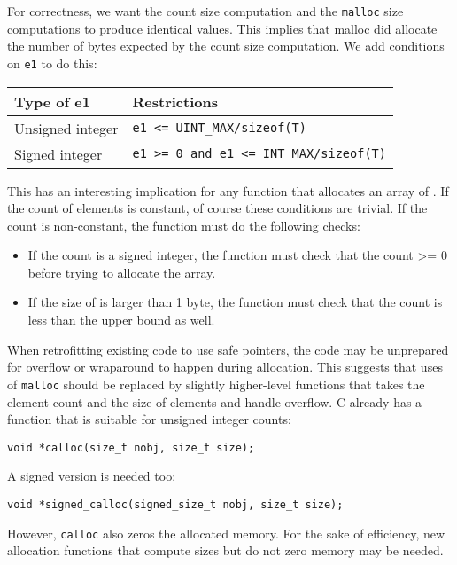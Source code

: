 For correctness, we want the count size computation and the
\texttt{malloc} size computations to produce identical values. This
implies that malloc did allocate the number of bytes expected by the
count size computation. We add conditions on \texttt{e1} to do this:

\begin{longtable}[c]{ll}
\toprule
Type of e1 & Restrictions\tabularnewline
\midrule
\endhead
Unsigned integer & \texttt{e1 <= UINT\_MAX/sizeof(T)}\tabularnewline
Signed integer & \texttt{e1 >= 0 and e1 <= INT\_MAX/sizeof(T)}\tabularnewline
\bottomrule
\end{longtable}

This has an interesting implication for any function that allocates an
array of . If the count of elements is constant, of course these
conditions are trivial. If the count is non-constant, the function
must do the following checks:

\begin{itemize}
\item
  If the count is a signed integer, the function must check that the
  count \textgreater{}= 0 before trying to allocate the array.
\item
  If the size of  is larger than 1 byte, the function must check that the
  count is less than the upper bound as well.
\end{itemize}

When retrofitting existing code to use safe pointers, the code may be
unprepared for overflow or wraparound to happen during allocation. This
suggests that uses of \texttt{malloc} should be replaced by slightly
higher-level functions that takes the element count and the size of
elements and handle overflow. C already has a function that is suitable
for unsigned integer counts:

\begin{verbatim}
void *calloc(size_t nobj, size_t size);
\end{verbatim}

A signed version is needed too:
\begin{verbatim}
void *signed_calloc(signed_size_t nobj, size_t size);
\end{verbatim}
However, \texttt{calloc} also zeros the allocated memory.  For the sake of efficiency,
new allocation functions that compute sizes but do not zero memory may be needed.